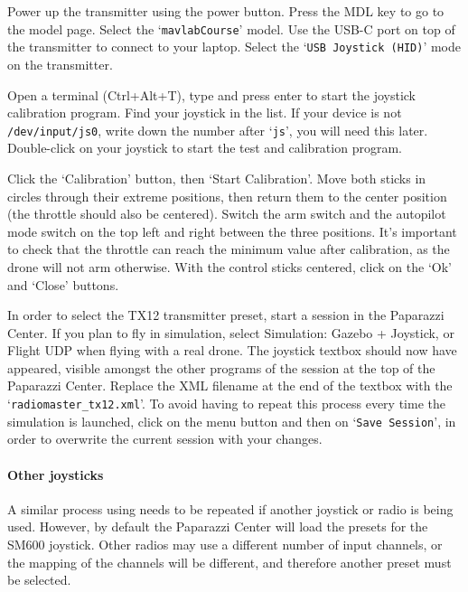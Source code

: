 Power up the transmitter using the power button. Press the MDL key to go to the model page. Select the `\texttt{mavlabCourse}' model. Use the USB-C port on top of the transmitter to connect to your laptop. Select the `\texttt{USB Joystick (HID)}' mode on the transmitter.

Open a terminal (Ctrl+Alt+T), type  and press enter to start the joystick calibration program. Find your joystick in the list. If your device is not \texttt{/dev/input/js0}, write down the number after `\texttt{js}', you will need this later. Double-click on your joystick to start the test and calibration program.

Click the `Calibration' button, then `Start Calibration'. Move both sticks in circles through their extreme positions, then return them to the center position (the throttle should also be centered). Switch the arm switch and the autopilot mode switch on the top left and right between the three positions. It's important to check that the throttle can reach the minimum value after calibration, as the drone will not arm otherwise. With the control sticks centered, click on the `Ok' and `Close' buttons.

In order to select the TX12 transmitter preset, start a session in the Paparazzi Center. If you plan to fly in simulation, select Simulation: Gazebo + Joystick, or Flight UDP when flying with a real drone. The joystick textbox should now have appeared, visible amongst the other programs of the session at the top of the Paparazzi Center. Replace the XML filename at the end of the textbox with the `\texttt{radiomaster\_tx12.xml}'. To avoid having to repeat this process every time the simulation is launched, click on the menu button  and then on `\texttt{Save Session}', in order to overwrite the current session with your changes.

\paragraph{Other joysticks}

A similar process using  needs to be repeated if another joystick or radio is being used. However, by default the Paparazzi Center will load the presets for the SM600 joystick. Other radios may use a different number of input channels, or the mapping of the channels will be different, and therefore another preset must be selected.

